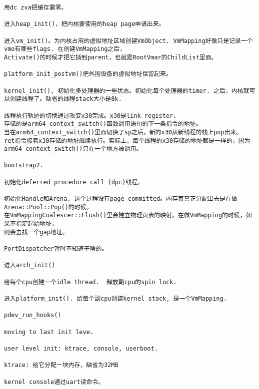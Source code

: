 \begin{verbatim}
用dc zva把缓存置零。

进入heap_init()，把内核要使用的heap page申请出来。

进入vm_init()。为内核占用的虚拟地址区域创建VmObject. VmMapping好像只是记录一个vmo有哪些flags. 在创建VmMapping之后，
Activate()的时候才把它插到parent，也就是RootVmar的ChildList里面。

platform_init_postvm()把外围设备的虚拟地址保留起来。

kernel_init(), 初始化多处理器的一些状态。初始化每个处理器的timer. 之后，内核就可以创建线程了。缺省的线程stack大小是8k.

线程执行轨迹的切换通过改变x30完成。x30是link register，
存储的是arm64_context_switch()函数调用语句的下一条指令的地址。
当在arm64_context_switch()里面切换了sp之后，新的x30从新线程的栈上pop出来。
ret指令接着x30存储的地址继续执行。实际上，每个线程的x30存储的地址都是一样的，因为
arm64_context_switch()只在一个地方被调用。

bootstrap2.

初始化deferred procedure call (dpc)线程。

初始化Handle和Arena. 这个过程没有page committed。内存页真正分配出去是在做Arena::Pool::Pop()的时候。
在VmMappingCoalescer::Flush()里会建立物理页表的映射。在做VmMapping的时候，如果不指定起始地址，
则会去找一个gap地址。

PortDispatcher暂时不知道干啥的。

进入arch_init()

给每个cpu创建一个idle thread.  释放副cpu的spin lock.

进入platform_init(). 给每个副cpu创建kernel stack, 是一个VmMapping.

pdev_run_hooks()

moving to last init leve.

user level init: ktrace, console, userboot.

ktrace: 给它分配一块内存，缺省为32MB

kernel console通过uart读命令。

\end{verbatim}














